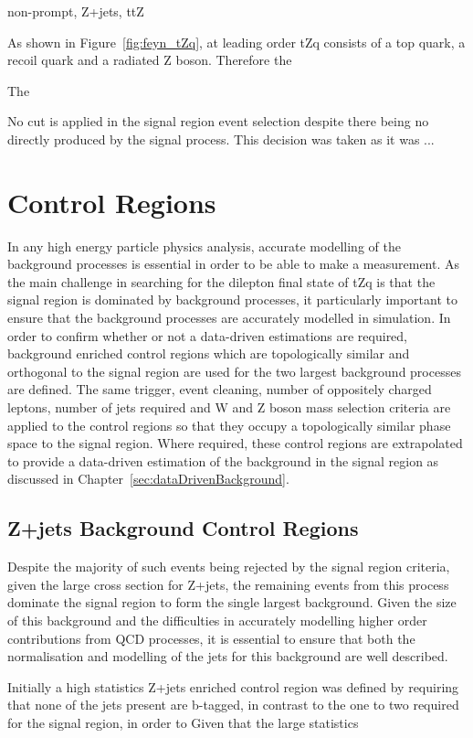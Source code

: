 non-prompt, Z+jets, ttZ

As shown in Figure~\ref{fig:feyn_tZq}, at leading order tZq consists of a top quark, a recoil quark and a radiated Z boson.
Therefore the 

The 

No \MET cut is applied in the signal region event selection despite there being no \MET directly produced by the signal process.
This decision was taken as it was ...

\section{Control Regions}\label{sec:controlRegions}
In any high energy particle physics analysis, accurate modelling of the background processes is essential in order to be able to make a measurement.
As the main challenge in searching for the dilepton final state of tZq is that the signal region is dominated by background processes, it particularly important to ensure that the background processes are accurately modelled in simulation.
In order to confirm whether or not a data-driven estimations are required, background enriched control regions which are topologically similar and orthogonal to the signal region are used for the two largest background processes are defined.
The same trigger, event cleaning, number of oppositely charged leptons, number of jets required and W and Z boson mass selection criteria are applied to the control regions so that they occupy a topologically similar phase space to the signal region.
Where required, these control regions are extrapolated to provide a data-driven estimation of the background in the signal region as discussed in Chapter~\ref{sec:dataDrivenBackground}.

\subsection{Z+jets Background Control Regions}\label{subsec:zPlusJetsCR}
Despite the majority of such events being rejected by the signal region criteria, given the large cross section for Z+jets, the remaining events from this process dominate the signal region to form the single largest background.
Given the size of this background and the difficulties in accurately modelling higher order contributions from QCD processes, it is essential to ensure that both the normalisation and modelling of the jets for this background are well described.

Initially a high statistics Z+jets enriched control region was defined by requiring that none of the jets present are b-tagged, in contrast to the one to two required for the signal region, in order to 
Given that the
large statistics 



